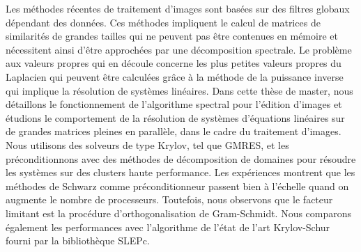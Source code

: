 Les méthodes récentes de traitement d'images sont basées sur des filtres globaux dépendant des données.
Ces méthodes impliquent le calcul de matrices de similarités de grandes tailles qui ne peuvent pas être contenues en mémoire et nécessitent ainsi d'être approchées par une décomposition spectrale.
Le problème aux valeurs propres qui en découle concerne les plus petites valeurs propres du Laplacien qui peuvent être calculées grâce à la méthode de la puissance inverse qui implique la résolution de systèmes linéaires.
Dans cette thèse de master, nous détaillons le fonctionnement de l'algorithme spectral pour l'édition d'images et étudions le comportement de la résolution de systèmes d'équations linéaires sur de grandes matrices pleines en parallèle, dans le cadre du traitement d'images.
Nous utilisons des solveurs de type Krylov, tel que GMRES, et les préconditionnons avec des méthodes de décomposition de domaines pour résoudre les systèmes sur des clusters haute performance.
Les expériences montrent que les méthodes de Schwarz comme préconditionneur passent bien à l'échelle quand on augmente le nombre de processeurs.
Toutefois, nous observons que le facteur limitant est la procédure d'orthogonalisation de Gram-Schmidt.
Nous comparons également les performances avec l'algorithme de l'état de l'art Krylov-Schur fourni par la bibliothèque SLEPc.
